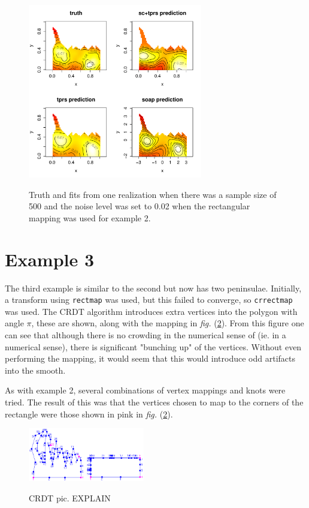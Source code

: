 \documentclass[a4paper,10pt]{amsart}
\newcommand{\fig}[1]{\emph{fig.} (\ref{#1})}
\begin{document}
\begin{figure}
\centering
\includegraphics[width=3in]{figs-otherdomains/wigglytop-real.pdf} \\
\caption{Truth and fits from one realization when there was a sample size of 500 and the noise level was set to 0.02 when the rectangular mapping was used for example 2. }
\label{wigglytop-real}
\end{figure}





\section{Example 3}

The third example is similar to the second but now has two peninsulae. Initially, a transform using \texttt{rectmap} was used, but this failed to converge, so \texttt{crrectmap} was used. The CRDT algorithm introduces extra vertices into the polygon with angle $\pi$, these are shown, along with the mapping in \fig{wigglytop2-numbered}. From this figure one can see that although there is no crowding in the numerical sense of \cite{driscoll} (ie. in a numerical sense), there is significant "bunching up" of the vertices. Without even performing the mapping, it would seem that this would introduce odd artifacts into the smooth.

As with example 2, several combinations of vertex mappings and knots were tried. The result of this was that the vertices chosen to map to the corners of the rectangle were those shown in pink in \fig{wigglytop2-numbered}.

\begin{figure}
\centering
\includegraphics[width=2in]{figs-otherdomains/wigglytop2-numbered.png} \\
\caption{CRDT pic. EXPLAIN}
\label{wigglytop2-numbered}
\end{figure}
\end{document}

